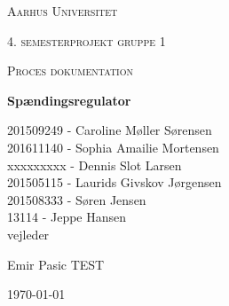 
\thispagestyle{empty}
{\centering
	{\scshape\LARGE Aarhus Universitet \par}
	\vspace{1cm}
	{\scshape\Large 4. semesterprojekt gruppe 1\par}
	{\scshape\Large Proces dokumentation\par}
	\vspace{1.5cm}
	{\huge\bfseries Spændingsregulator\par}
	\vspace{2cm}
	{\Large
		201509249 - Caroline Møller Sørensen\\
		201611140 - Sophia Amailie Mortensen\\
		xxxxxxxxx - Dennis Slot Larsen \\
		201505115 - Laurids Givskov Jørgensen\\
		201508333 - Søren Jensen\\
	13114 - Jeppe Hansen\\   }
	\vfill
	vejleder\par
	Emir Pasic TEST
	
	\vfill
	
	{\large \today\par}
	\par}



